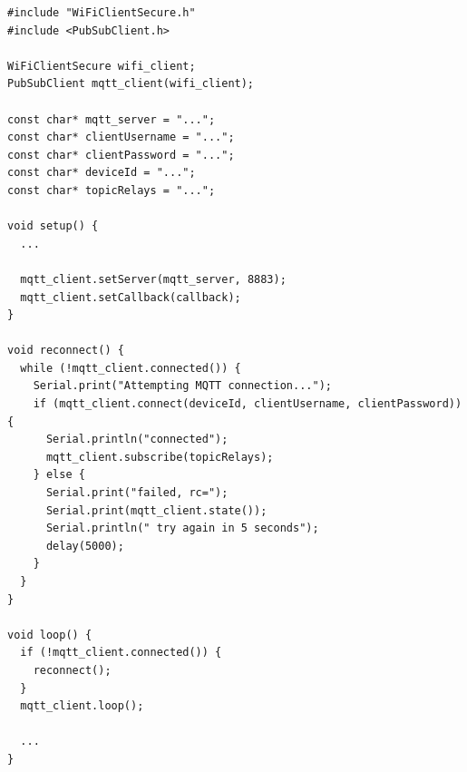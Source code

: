 \begin{lstlisting}[label=cod:conexionMQTT,caption=Conexión al \emph{broker} MQTT]
#include "WiFiClientSecure.h"
#include <PubSubClient.h>

WiFiClientSecure wifi_client;
PubSubClient mqtt_client(wifi_client);

const char* mqtt_server = "...";
const char* clientUsername = "...";
const char* clientPassword = "...";
const char* deviceId = "...";
const char* topicRelays = "...";

void setup() {
  ...

  mqtt_client.setServer(mqtt_server, 8883);
  mqtt_client.setCallback(callback);
}

void reconnect() {
  while (!mqtt_client.connected()) {
    Serial.print("Attempting MQTT connection...");
    if (mqtt_client.connect(deviceId, clientUsername, clientPassword)) {
      Serial.println("connected");
      mqtt_client.subscribe(topicRelays);
    } else {
      Serial.print("failed, rc=");
      Serial.print(mqtt_client.state());
      Serial.println(" try again in 5 seconds");
      delay(5000);
    }
  }
}

void loop() {
  if (!mqtt_client.connected()) {
    reconnect();
  }
  mqtt_client.loop();
  
  ...
}
\end{lstlisting}
